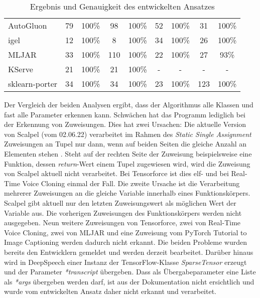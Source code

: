 \documentclass[german,bachelor]{swsLeipzig}
\begin{document}
\begin{table}[H]
\begin{center}
\begin{tabular}[h]{l|c|c|c|c|c|c|c|c}
\hline
AutoGluon                   & 79        & 100\%             & 98        & 100\%                 & 52        & 100\% & 31            & 100\%\\
igel                        & 12        & 100\%             & 8         & 100\%                 & 34        & 100\% & 26            & 100\%\\
MLJAR                       & 33        & 100\%             & 110       & 100\%                 & 22        & 100\% & 27            & 93\%\\
KServe                      & 21        & 100\%             & 21        & 100\%                 & -         & - & -                 & -\\
sklearn-porter              & 34        & 100\%             & 34        & 100\%                 & 23        & 100\% & 123           & 100\%\\
\hline
\end{tabular}
\caption{Ergebnis und Genauigkeit des entwickelten Ansatzes} \label{analyse}
\end{center}
\end{table}

Der Vergleich der beiden Analysen ergibt, dass der Algorithmus alle Klassen und fast alle Parameter erkennen kann.
Schwächen hat das Programm lediglich bei der Erkennung von Zuweisungen.
Dies hat zwei Ursachen:
Die aktuelle Version von Scalpel (vom 02.06.22) verarbeitet im Rahmen des \textit{Static Single Assignment} Zuweisungen an Tupel nur dann,
wenn auf beiden Seiten die gleiche Anzahl an Elementen stehen \cite[]{li2022scalpel}.
Steht auf der rechten Seite der Zuweisung beispielsweise eine Funktion, dessen \textit{return}-Wert einem Tupel zugewiesen wird,
wird die Zuweisung von Scalpel aktuell nicht verarbeitet.
Bei Tensorforce ist dies elf- und bei Real-Time Voice Cloning einmal der Fall.
Die zweite Ursache ist die Verarbeitung mehrerer Zuweisungen an die gleiche Variable innerhalb eines Funktionskörpers.
Scalpel gibt aktuell nur den letzten Zuweisungswert als möglichen Wert der Variable aus.
Die vorherigen Zuweisungen des Funktionskörpers werden nicht ausgegeben.
Neun weitere Zuweisungen von Tensorforce, zwei von Real-Time Voice Cloning, zwei von MLJAR und
eine Zuweisung vom PyTorch Tutorial to Image Captioning werden dadurch nicht erkannt.
Die beiden Probleme wurden bereits den Entwicklern gemeldet und werden derzeit bearbeitet.
Darüber hinaus wird in DeepSpeech einer Instanz der TensorFlow-Klasse \textit{SparseTensor} erzeugt und der Parameter \textit{*transcript} übergeben.
Dass als Übergabeparameter eine Liste als \textit{*args} übergeben werden darf, ist aus der Dokumentation nicht ersichtlich
und wurde vom entwickelten Ansatz daher nicht erkannt und verarbeitet.\\
\end{document}

